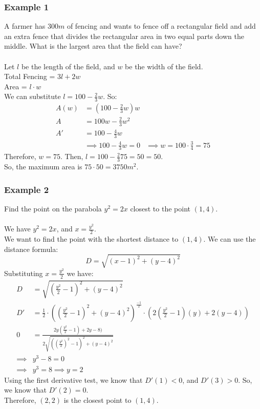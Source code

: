 \documentclass{article}
\begin{document}
\subsubsection{Example 1}
A farmer has $300m$ of fencing and wants to fence off a rectangular field and add an extra fence that divides the rectangular area in two equal parts down the middle. What is the largest area that the field can have?\\
\\
Let $l$ be the length of the field, and $w$ be the width of the field.\\
Total Fencing = $3l + 2w$\\
Area = $l \cdot w$\\
We can substitute $l = 100 - \frac{2}{3}w$. So:
\begin{align*}
    A(w) & = (100 - \frac{2}{3}w)w\\
    A & = 100w - \frac{2}{3}w^2\\
    A' & = 100 - \frac{4}{3}w\\
    & \implies 100 - \frac{4}{3}w = 0
    & \implies w = 100 \cdot \frac{3}{4} = 75
\end{align*}
Therefore, $w = 75$.
Then, $l = 100 - \frac{2}{3}75 = 50 = 50$.\\
So, the maximum area is $75 \cdot 50 = 3750 m^2$.

\subsubsection{Example 2}
Find the point on the parabola $y^2 = 2x$ closest to the point $(1,4)$.\\
\\
We have $y^2 = 2x$, and $x = \frac{y^2}{2}$.\\
We want to find the point with the shortest distance to $(1,4)$. We can use the distance formula:
$$D = \sqrt{(x - 1)^2 + (y - 4)^2}$$
Substituting $x = \frac{y^2}{2}$ we have:
\begin{align*}
    D & = \sqrt{(\frac{y^2}{2} - 1)^2 + (y - 4)^2}\\
    D' & = \frac{1}{2} \cdot ((\frac{y^2}{2} - 1)^2 + (y-4)^2)^{\frac{-1}{2}} \cdot (2(\frac{y^2}{2} - 1) (y) + 2(y - 4))\\
    0 & = \frac{2y(\frac{y^2}{2} - 1) + 2y - 8)}{2\sqrt{((\frac{y^2}{2})^2 - 1)^2 + (y - 4)^2}}\\
    \implies & y^3 - 8 = 0\\
    \implies & y^3 = 8 \implies y = 2
\end{align*}
Using the first derivative test, we know that $D'(1) < 0$, and $D'(3) > 0$. So, we know that $D'(2) = 0$.\\
Therefore, $(2,2)$ is the closest point to $(1,4)$.
\end{document}
